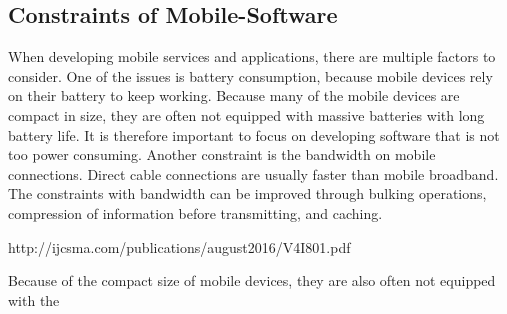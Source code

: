 \subsection{Constraints of Mobile-Software}

When developing mobile services and applications, there are multiple factors to consider. One of the issues is battery consumption, because mobile devices rely on their battery to keep working. Because many of the mobile devices are compact in size, they are often not equipped with massive batteries with long battery life. It is therefore important to focus on developing software that is not too power consuming. Another constraint is the bandwidth on mobile connections. Direct cable connections are usually faster than mobile broadband. The constraints with bandwidth can be improved through bulking operations, compression of information before transmitting, and caching. 

http://ijcsma.com/publications/august2016/V4I801.pdf

Because of the compact size of mobile devices, they are also often not equipped with the 